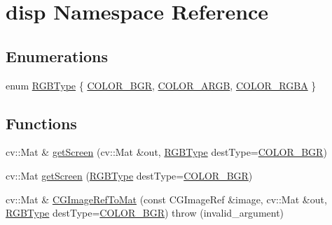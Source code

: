 \hypertarget{namespacedisp}{\section{disp Namespace Reference}
\label{namespacedisp}
}
\subsection*{Enumerations}
\begin{DoxyCompactItemize}
\item 
enum \hyperlink{namespacedisp_a3fe26067fc36284055f51c9063a8d771}{R\-G\-B\-Type} \{ \hyperlink{namespacedisp_a3fe26067fc36284055f51c9063a8d771afe53ce31ce41cee6eb9fba18bd117ec4}{C\-O\-L\-O\-R\-\_\-\-B\-G\-R}, 
\hyperlink{namespacedisp_a3fe26067fc36284055f51c9063a8d771a1500b650e69483ea28dc94d0edf8b9e6}{C\-O\-L\-O\-R\-\_\-\-A\-R\-G\-B}, 
\hyperlink{namespacedisp_a3fe26067fc36284055f51c9063a8d771ad2cae24eb56bcd9de466532418c07a64}{C\-O\-L\-O\-R\-\_\-\-R\-G\-B\-A}
 \}
\end{DoxyCompactItemize}
\subsection*{Functions}
\begin{DoxyCompactItemize}
\item 
cv\-::\-Mat \& \hyperlink{namespacedisp_a764c2b712f54b0453f00f2ab744ca92e}{get\-Screen} (cv\-::\-Mat \&out, \hyperlink{namespacedisp_a3fe26067fc36284055f51c9063a8d771}{R\-G\-B\-Type} dest\-Type=\hyperlink{namespacedisp_a3fe26067fc36284055f51c9063a8d771afe53ce31ce41cee6eb9fba18bd117ec4}{C\-O\-L\-O\-R\-\_\-\-B\-G\-R})
\item 
cv\-::\-Mat \hyperlink{namespacedisp_ace1b5fd6d30a2dd47ad8fe9b35f1e571}{get\-Screen} (\hyperlink{namespacedisp_a3fe26067fc36284055f51c9063a8d771}{R\-G\-B\-Type} dest\-Type=\hyperlink{namespacedisp_a3fe26067fc36284055f51c9063a8d771afe53ce31ce41cee6eb9fba18bd117ec4}{C\-O\-L\-O\-R\-\_\-\-B\-G\-R})
\item 
cv\-::\-Mat \& \hyperlink{namespacedisp_a839f9b2e3eec52d78311195347d75a5b}{C\-G\-Image\-Ref\-To\-Mat} (const C\-G\-Image\-Ref \&image, cv\-::\-Mat \&out, \hyperlink{namespacedisp_a3fe26067fc36284055f51c9063a8d771}{R\-G\-B\-Type} dest\-Type=\hyperlink{namespacedisp_a3fe26067fc36284055f51c9063a8d771afe53ce31ce41cee6eb9fba18bd117ec4}{C\-O\-L\-O\-R\-\_\-\-B\-G\-R})  throw (invalid\-\_\-argument)
\end{DoxyCompactItemize}


